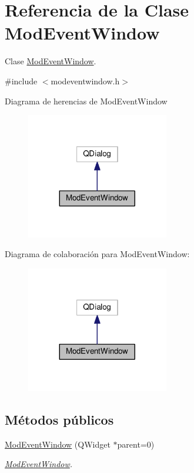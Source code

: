 \hypertarget{class_mod_event_window}{}\section{Referencia de la Clase Mod\+Event\+Window}
\label{class_mod_event_window}


Clase \hyperlink{class_mod_event_window}{Mod\+Event\+Window}.  




{\ttfamily \#include $<$modeventwindow.\+h$>$}



Diagrama de herencias de Mod\+Event\+Window\nopagebreak
\begin{figure}[H]
\begin{center}
\leavevmode
\includegraphics[width=176pt]{class_mod_event_window__inherit__graph}
\end{center}
\end{figure}


Diagrama de colaboración para Mod\+Event\+Window\+:\nopagebreak
\begin{figure}[H]
\begin{center}
\leavevmode
\includegraphics[width=176pt]{class_mod_event_window__coll__graph}
\end{center}
\end{figure}
\subsection*{Métodos públicos}
\begin{DoxyCompactItemize}
\item 
\hyperlink{class_mod_event_window_af82d1d1a727a13d06d33500f897bd2b2}{Mod\+Event\+Window} (Q\+Widget $\ast$parent=0)
\begin{DoxyCompactList}\small\item\em \hyperlink{class_mod_event_window}{Mod\+Event\+Window}. \end{DoxyCompactList}\end{DoxyCompactItemize}


